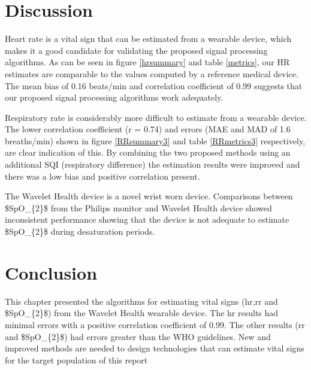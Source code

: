 \section{Discussion}

Heart rate is a vital sign that can be estimated from a wearable device, which makes it a good candidate for validating the proposed signal processing algorithms. As can be seen in figure \ref{hrsummary} and table \ref{metrics}, our HR estimates are comparable to the values computed by a reference medical device. The mean bias of 0.16 beats/min and correlation coefficient of 0.99 suggests that our proposed signal processing algorithms work adequately.

Respiratory rate is considerably more difficult to estimate from a wearable device. The lower correlation coefficient (r = 0.74) and errors (MAE and MAD of 1.6 breaths/min) shown in figure \ref{RRsummary3} and table \ref{RRmetrics3} respectively, are clear indication of this. By combining the two proposed methods using an additional SQI (respiratory difference) the estimation results were improved and there was a low bias and positive correlation present. 

The Wavelet Health device is a novel wrist worn device. Comparisons between \gls{$SpO_{2}$} from the Philips monitor and Wavelet Health device showed inconsistent performance showing that the device is not adequate to estimate \gls{$SpO_{2}$} during desaturation periods.

\section{Conclusion}

This chapter presented the algorithms for estimating vital signs (\gls{hr},\gls{rr} and \gls{$SpO_{2}$}) from the Wavelet Health wearable device. The \gls{hr} results had minimal errors with a positive correlation coefficient of 0.99. The other results (\gls{rr} and \gls{$SpO_{2}$}) had errors greater than the WHO guidelines. New and improved methods are needed to design technologies that can estimate vital signs for the target population of this report

